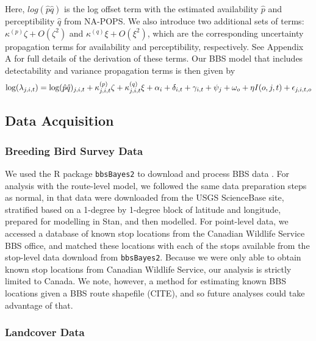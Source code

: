 \documentclass[12pt]{article}
\begin{document}
\par Here, $log(\hat{p} \hat{q})$ is the log offset term with the estimated availability $\hat{p}$ and perceptibility $\hat{q}$ from NA-POPS. 
We also introduce two additional sets of terms: $\kappa^{(p)}\zeta + O(\zeta^2)$ and $\kappa^{(q)}\xi + O(\xi^2)$, which are the corresponding uncertainty propagation terms for availability and perceptibility, respectively.  
See Appendix A for full details of the derivation of these terms.
Our BBS model that includes detectability and variance propagation terms is then given by
\begin{equation}\label{bbs_varprop}
	\log(\lambda_{j,i,t}) = \log(\hat{p} \hat{q})_{j,i,t} + \kappa_{j,i,t}^{(p)}\zeta + \kappa_{j,i,t}^{(q)}\xi + \alpha_i + \delta_{i,t} + \gamma_{i,t} + \psi_j + \omega_o + \eta I(o,j,t) + \epsilon_{j,i,t,o} \\
\end{equation}

\subsection{Data Acquisition}

\subsubsection{Breeding Bird Survey Data}

\par We used the R package \texttt{bbsBayes2} to download and process BBS data \citep{edwards_bbsbayes_2021}. 
For analysis with the route-level model, we followed the same data preparation steps as normal, in that data were downloaded from the USGS ScienceBase site, stratified based on a 1-degree by 1-degree block of latitude and longitude, prepared for modelling in Stan, and then modelled.
For point-level data, we accessed a database of known stop locations from the Canadian Wildlife Service BBS office, and matched these locations with each of the stops available from the stop-level data download from \texttt{bbsBayes2}.
Because we were only able to obtain known stop locations from Canadian Wildlife Service, our analysis is strictly limited to Canada.
We note, however, a method for estimating known BBS locations given a BBS route shapefile (CITE), and so future analyses could take advantage of that.

\subsubsection{Landcover Data}
\end{document}
